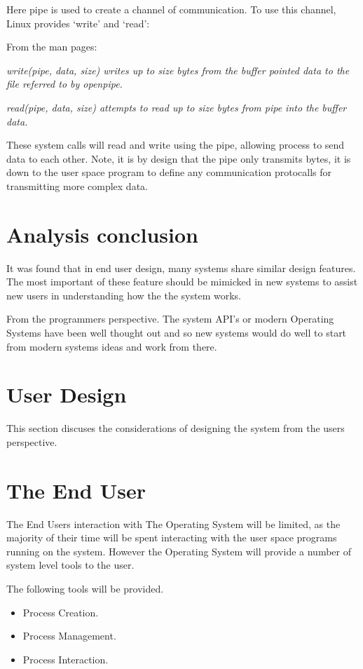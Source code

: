 \documentclass[a4paper]{report}
\begin{document}
Here pipe is used to create a channel of communication. To use this channel, Linux provides `write' and `read':

From the man pages:

\textit{write(pipe, data, size) writes up to size bytes from the buffer pointed data to the file referred to by openpipe.} \cite{manWrite}

\textit{read(pipe, data, size) attempts to read up to size bytes from pipe into the buffer data.} \cite{manRead}

These system calls will read and write using the pipe, allowing process to send data to each other. Note, it is by design that the pipe only transmits bytes, it is down to the user space program to define any communication protocalls for transmitting more complex data.

\section{Analysis conclusion}

It was found that in end user design, many systems share similar design features. The most important of these feature should be mimicked in new systems to assist new users in understanding how the the system works.

From the programmers perspective. The system API's or modern Operating Systems have been well thought out and so new systems would do well to start from modern systems ideas and work from there.


\clearpage
\section{User Design}

This section discuses the considerations of designing the system from the users perspective.

\section{The End User}

The End Users interaction with The Operating System will be limited, as the majority of their time will be spent interacting with the user space programs running on the system. However the Operating System will provide a number of system level tools to the user.

The following tools will be provided.
\begin{itemize}
\item Process Creation.
\item Process Management.
\item Process Interaction.
\end{itemize}
\end{document}
